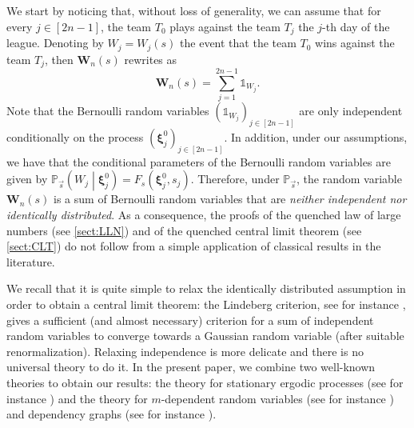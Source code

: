 \documentclass[11pt,a4paper,oneside]{article}
\theoremstyle{definition}
\theoremstyle{remark}
\def\P{\mathbb{P}}
\begin{document}
We start by noticing that, without loss of generality, we can assume that for every $j\in[2n-1]$, the team $T_{0}$ plays against the team $T_j$ the $j$-th day of the league. Denoting by $W_{j}=W_j(s)$ the event that the team $T_{0}$ wins against the team $T_j$, then $\bm W_n(s)$ rewrites as 
\begin{equation}
	\bm W_n(s)=\sum_{j=1}^{2n-1}\mathds{1}_{W_j}. 
\end{equation}
Note that the Bernoulli random variables $(\mathds{1}_{W_j})_{j\in[2n-1]}$ are only independent conditionally on the process $(\bm \xi^{0}_j)_{j\in[2n-1]}$.
In addition, under our assumptions, we have that the conditional parameters of the Bernoulli random variables are given by $\P_{\vec{s}} \left(W_j\middle | \bm \xi^{0}_j\right)= F_s (\bm \xi^{0}_j, s_j )$.
Therefore, under $\P_{\vec{s}}$, the random variable $\bm W_n(s)$ is a sum of Bernoulli  random variables that are \emph{neither independent nor identically distributed}. As a consequence, the proofs of the quenched law of large numbers (see \cref{sect:LLN}) and of the quenched central limit theorem (see \cref{sect:CLT}) do not follow from a simple application of classical results in the literature. 

We recall that it is quite simple to relax the identically distributed assumption in order to obtain a central limit theorem: the Lindeberg criterion, see for instance \cite[Theorem 27.2]{MR1324786}, gives a sufficient (and almost necessary) criterion for a sum of independent random
variables to converge towards a Gaussian random variable (after suitable renormalization). Relaxing independence is more delicate and there is no universal theory to do it. In the present paper, we combine two well-known theories to obtain our results: the theory for stationary ergodic processes (see for instance \cite{MR74711, MR0148125, MR0322926, MR1176496, MR2325294}) and the theory for $m$-dependent random variables (see for instance \cite{MR26771,MR350815,MR1747098}) and dependency graphs (see for instance \cite{MR681466, MR920273, MR1048950, MR2068873, MR4105789}).
\end{document}
